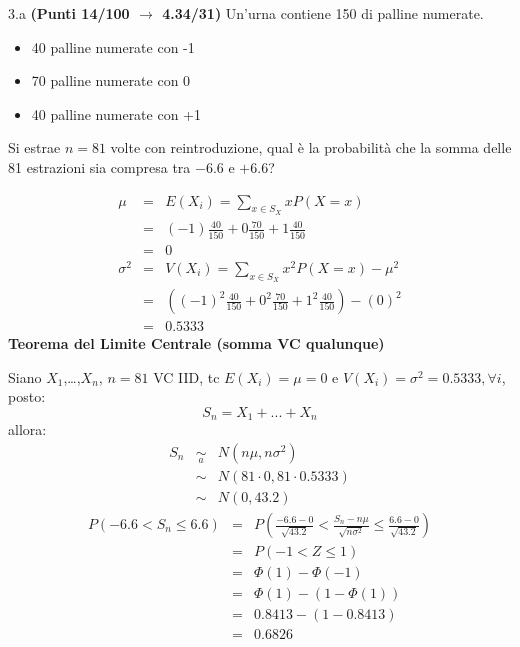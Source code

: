 \documentclass[
  11pt,
]{book}
\providecommand{\tightlist}{%
  \setlength{\itemsep}{0pt}\setlength{\parskip}{0pt}}
\theoremstyle{mytheoremstyle}
\theoremstyle{mydefstyle}
\newenvironment{sol}
  {
  \begin{tcolorbox}[enhanced,breakable,arc=0.1mm,boxrule=1pt,colback=white,colframe=iblue,
  title=\bf \fontfamily{lmss}\selectfont \hspace{.5 cm} Soluzione,drop fuzzy shadow]

}{
\end{tcolorbox}
  }
\begin{document}
3.a \textbf{(Punti 14/100 \(\rightarrow\) 4.34/31)} Un'urna contiene 150 di palline numerate.

\begin{itemize}
\tightlist
\item
  40 palline numerate con -1
\item
  70 palline numerate con 0
\item
  40 palline numerate con +1
\end{itemize}

Si estrae \(n=81\) volte con reintroduzione, qual è la probabilità che la somma delle 81 estrazioni sia compresa tra
\(-6.6\) e \(+6.6\)?

\begin{sol}
\begin{eqnarray*} \mu &=& E(X_i) = \sum_{x\in S_X}x P(X=x)\\ 
 &=& ( -1 ) \frac { 40 }{ 150 }+ 0  \frac { 70 }{ 150 }+ 1  \frac { 40 }{ 150 } \\ 
            &=& 0 \\ 
 \sigma^2 &=& V(X_i) = \sum_{x\in S_X}x^2 P(X=x)-\mu^2\\ 
 &=&\left( ( -1 ) ^2\frac { 40 }{ 150 }+ 0  ^2\frac { 70 }{ 150 }+ 1  ^2\frac { 40 }{ 150 } \right)-( 0 )^2\\ 
            &=& 0.5333 
\end{eqnarray*}
\textbf{Teorema del Limite Centrale (somma VC qualunque)}

Siano \(X_1\),\ldots,\(X_n\), \(n=81\) VC IID, tc \(E(X_i)=\mu=0\) e \(V(X_i)=\sigma^2=0.5333,\forall i\), posto:
\[
      S_n = X_1 + ... + X_n
      \]
allora:\begin{eqnarray*}
  S_n & \mathop{\sim}\limits_{a}& N(n\mu,n\sigma^2) \\
     &\sim & N(81\cdot0,81\cdot0.5333) \\
     &\sim & N(0,43.2) 
  \end{eqnarray*}\begin{eqnarray*}
   P( -6.6 < S_n \leq  6.6 ) &=& P\left( \frac { -6.6  -  0 }{\sqrt{ 43.2 }} < \frac { S_n  -  n\mu }{ \sqrt{n\sigma^2} } \leq \frac { 6.6  -  0 }{\sqrt{ 43.2 }}\right)  \\
              &=& P\left(  -1  < Z \leq  1 \right) \\
              &=& \Phi( 1 )-\Phi( -1 )\\
              &=&  \Phi( 1 )-(1-\Phi( 1 )) \\ &=&  0.8413 -(1- 0.8413 ) \\ 
              &=&  0.6826 
   \end{eqnarray*}

\end{sol}
\end{document}
